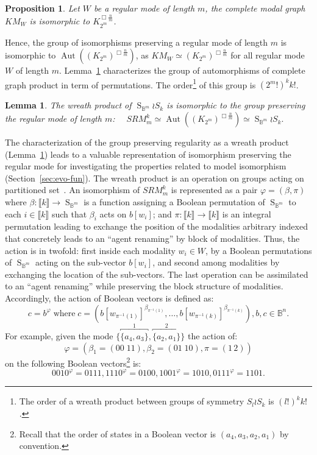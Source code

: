 \documentclass[12pt]{elsarticle}
\newtheorem{lemma}{Lemma}
\newtheorem{proposition}{Proposition}
\newcommand{\Bset}[0]{\mathbb{B}}
\newcommand{\gsym}[1]{\operatorname{S}_{#1}}
\newcommand{\aut}[0]{\operatorname{Aut}}
\begin{document}
\begin{proposition}
\label{prop:srm}
Let $W$ be a regular mode of length $m$, the complete modal graph $KM_W$ is isomorphic to $K_{2^m}^{\Box \frac{n}{m}}$.
\end{proposition}
 Hence, the group of isomorphisms preserving a regular mode of length $m$ is isomorphic to $\aut( (K_{2^m})^{\Box \frac{n}{m}})$, as $KM_W \simeq (K_{2^m})^{\Box \frac{n}{m}}$ for all regular mode $W$ of length $m$. Lemma~\ref{lem:srm} characterizes the group of automorphisms of complete graph product in term of permutations. The order\footnote{The order of a wreath product between groups of symmetry $S_l \wr S_k$ is $(l!)^k k!$.} of this group is $\left(2^m!\right)^{k} k!$.

\begin{lemma} 
\label{lem:srm}
The wreath product of $\gsym{\Bset^m} \wr S_k$ is isomorphic to the group preserving the regular mode of length $m$:
$\quad SRM_m^k \simeq \aut( (K_{2^m})^{\Box \frac{n}{m}}) \simeq \gsym{\Bset^m} \wr S_k.$
\end{lemma}

The characterization of the group preserving regularity as a wreath product (Lemma~\ref{lem:srm}) leads to  a valuable representation of isomorphism preserving the regular mode for investigating the properties related to model isomorphism (Section~\ref{sec:evo-fun}).  
The wreath product is an operation on groups acting on partitioned set~\cite{Cameron1999}. An isomorphism of $SRM^k_m$   is represented as a pair $\varphi=(\beta, \pi)$ where $\beta: \llbracket k \rrbracket \to \gsym{\Bset^m} $ is a function assigning a Boolean permutation of $\gsym{\Bset^m}$ to each $i \in \llbracket k \rrbracket$ such that $\beta_i$ acts on $b[w_i]$; and $\pi: \llbracket k \rrbracket \to \llbracket k \rrbracket$ is an integral  permutation  leading to exchange the position of the modalities arbitrary indexed that concretely leads to an ``agent renaming'' by block of modalities. Thus, the action is in twofold: first inside each modality $w_i \in W$, by a  Boolean permutations of $\gsym{\Bset^m}$ acting on the sub-vector $b[w_i]$, and second among modalities by exchanging the location of the sub-vectors. The last operation can be assimilated to an ``agent renaming'' while preserving the block structure of modalities. Accordingly, the action of Boolean vectors is defined as:
\begin{equation}
c= b^\varphi \; \text{where} \; c=\left( b[w_{\pi^{-1}(1)}]^{\beta_{\pi^{-1}(1)}}, \ldots, b[w_{\pi^{-1}(k)}]^{\beta_{\pi^{-1}(k)}} \right), b,c \in \Bset^n.
\label{eq:action}
\end{equation}
For example, given the mode $\{\overbracket{\{a_4,a_3\}}^{1},\overbracket{\{a_2,a_1\}}^{2}\}$ the action of:
$$\varphi=(\beta_1=(00\; 11),\beta_2= (01\;10),\pi = (1 \, 2))$$ on the following Boolean vectors\footnote{Recall that the order of states in a Boolean vector is $(a_4,a_3,a_2,a_1)$ by convention.} is:
 $$0010^\varphi = 0111, 1110^\varphi=0100, 1001^\varphi=1010, 0111^\varphi=1101.$$
\end{document}
